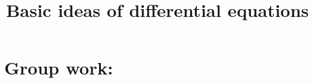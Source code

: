 \documentclass[]{ximera}
\title{Basic ideas of differential equations}
\begin{document}
\begin{abstract}		\end{abstract}
\maketitle

\section{Group work:}
\end{document}
